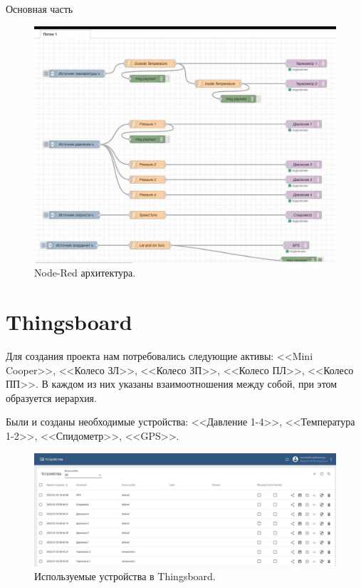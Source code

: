\begin{chapter}{Основная часть}
    \begin{figure}[!ht]
		\centering
		\includegraphics[scale=0.4]{pictures/8.jpg}
		\caption{Node-Red архитектура.}
		\label{fig1}
	\end{figure}
	

\section{Thingsboard}

    Для создания проекта нам потребовались следующие активы: <<Mini Cooper>>, <<Колесо ЗЛ>>, <<Колесо ЗП>>, <<Колесо ПЛ>>, <<Колесо ПП>>. В каждом из них указаны взаимоотношения между собой, при этом образуется иерархия.
    
    Были и созданы необходимые устройства: <<Давление 1-4>>, <<Температура 1-2>>, <<Спидометр>>, <<GPS>>.
    
    \begin{figure}[!ht]
		\centering
		\includegraphics[scale=0.4]{pictures/4.jpg}
		\caption{Используемые устройства в Thingsboard.}
		\label{fig1}
	\end{figure}


\end{chapter}
